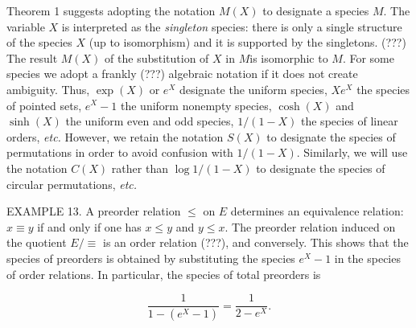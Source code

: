 \documentclass{article}
\theoremstyle{definition}
\theoremstyle{remark}
\newcommand{\etc}{\textit{etc.}\xspace}
\begin{document}
Theorem 1 suggests adopting the notation $M (X)$ to designate a
species $M$. The variable $X$ is interpreted as the \emph{singleton}
species: there is only a single structure of the species $X$ (up to
isomorphism) and it is supported by the singletons. (???) The result
$M (X)$ of the substitution of $X$ in $M$ ​​is isomorphic to $M$. For
some species we adopt a frankly (???)  algebraic notation if it does
not create ambiguity. Thus, $\exp (X)$ or $e^X$ designate the uniform
species, $X e^X$ the species of pointed sets, $e^X - 1$ the uniform
nonempty species, $\cosh (X)$ and $\sinh (X)$ the uniform even and odd
species, $1/(1 - X)$ the species of linear orders, \etc However, we
retain the notation $S (X)$ to designate the species of permutations
in order to avoid confusion with $1/(1-X)$. Similarly, we will use the
notation $C (X)$ rather than $\log 1/(1-X)$ to designate the species
of circular permutations, \etc

EXAMPLE 13. A preorder relation $\leq$ on $E$ determines an
equivalence relation: $x \equiv y$ if and only if one has $x \leq y$ and $y \leq x$.
The preorder relation induced on the quotient $E / \equiv$ is an order relation (???), and conversely.
This shows that the species of preorders is obtained by substituting the species
$e^X - 1$ in the species of order relations. In particular, the species of
total preorders is

\[ \frac{1}{1 - (e^X - 1)} = \frac{1}{2 - e^X}. \]



\end{document}

